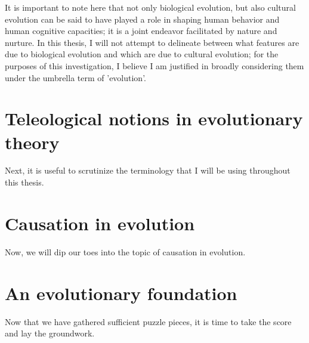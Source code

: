 It is important to note here that not only biological evolution, but also cultural evolution can be said to have played a role in shaping human behavior and human cognitive capacities; it is a joint endeavor facilitated by nature and nurture. In this thesis, I will not attempt to delineate between what features are due to biological evolution and which are due to cultural evolution; for the purposes of this investigation, I believe I am justified in broadly considering them under the umbrella term of 'evolution'.

\section{Teleological notions in evolutionary theory}

Next, it is useful to scrutinize the terminology that I will be using throughout this thesis.

\section{Causation in evolution}
\label{sec:causation-evolution}

Now, we will dip our toes into the topic of causation in evolution.

\section{An evolutionary foundation}

Now that we have gathered sufficient puzzle pieces, it is time to take the score and lay the groundwork.
